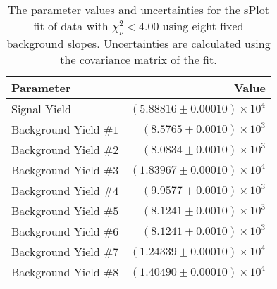 
\begin{table}[ht]
    \begin{center}
        \begin{tabular}{lr}\toprule
            Parameter & Value \\\midrule
            Signal Yield & $(5.88816 \pm 0.00010) \times 10^{4}$ \\
            Background Yield $\#1$ & $(8.5765 \pm 0.0010) \times 10^{3}$ \\
            Background Yield $\#2$ & $(8.0834 \pm 0.0010) \times 10^{3}$ \\
            Background Yield $\#3$ & $(1.83967 \pm 0.00010) \times 10^{4}$ \\
            Background Yield $\#4$ & $(9.9577 \pm 0.0010) \times 10^{3}$ \\
            Background Yield $\#5$ & $(8.1241 \pm 0.0010) \times 10^{3}$ \\
            Background Yield $\#6$ & $(8.1241 \pm 0.0010) \times 10^{3}$ \\
            Background Yield $\#7$ & $(1.24339 \pm 0.00010) \times 10^{4}$ \\
            Background Yield $\#8$ & $(1.40490 \pm 0.00010) \times 10^{4}$ \\\bottomrule
        \end{tabular}
        \caption{The parameter values and uncertainties for the sPlot fit of data with $\chi^2_\nu < 4.00$ using eight fixed background slopes. Uncertainties are calculated using the covariance matrix of the fit.}\label{tab:splot-fit-results-chisqdof-4.00-fixed-8}
    \end{center}
\end{table}
